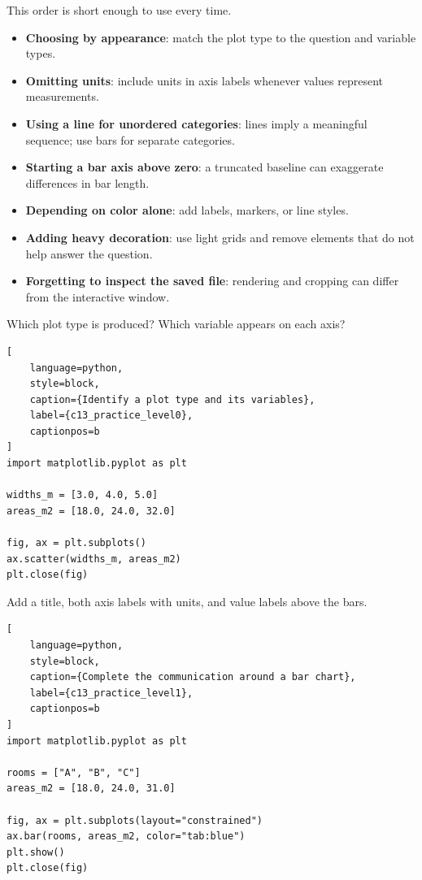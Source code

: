 This order is short enough to use every time.


\begin{itemize}
    \item \textbf{Choosing by appearance}: match the plot type to the question
    and variable types.
    \item \textbf{Omitting units}: include units in axis labels whenever values
    represent measurements.
    \item \textbf{Using a line for unordered categories}: lines imply a
    meaningful sequence; use bars for separate categories.
    \item \textbf{Starting a bar axis above zero}: a truncated baseline can
    exaggerate differences in bar length.
    \item \textbf{Depending on color alone}: add labels, markers, or line
    styles.
    \item \textbf{Adding heavy decoration}: use light grids and remove elements
    that do not help answer the question.
    \item \textbf{Forgetting to inspect the saved file}: rendering and cropping
    can differ from the interactive window.
\end{itemize}



Which plot type is produced? Which variable appears on each axis?

\begin{lstlisting}[
    language=python,
    style=block,
    caption={Identify a plot type and its variables},
    label={c13_practice_level0},
    captionpos=b
]
import matplotlib.pyplot as plt

widths_m = [3.0, 4.0, 5.0]
areas_m2 = [18.0, 24.0, 32.0]

fig, ax = plt.subplots()
ax.scatter(widths_m, areas_m2)
plt.close(fig)
\end{lstlisting}


Add a title, both axis labels with units, and value labels above the bars.

\begin{lstlisting}[
    language=python,
    style=block,
    caption={Complete the communication around a bar chart},
    label={c13_practice_level1},
    captionpos=b
]
import matplotlib.pyplot as plt

rooms = ["A", "B", "C"]
areas_m2 = [18.0, 24.0, 31.0]

fig, ax = plt.subplots(layout="constrained")
ax.bar(rooms, areas_m2, color="tab:blue")
plt.show()
plt.close(fig)
\end{lstlisting}

